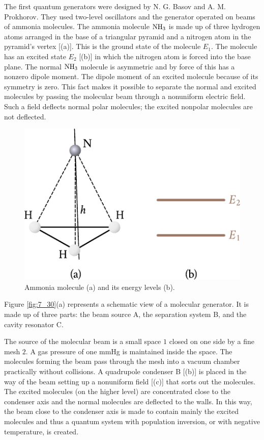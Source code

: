 The first quantum generators were designed by N. G. Basov and A. M. Prokhorov. They used two-level oscillators and the generator operated on beams of ammonia molecules. The ammonia molecule $\ce{NH3}$ is made up of three hydrogen atoms arranged in the base of a triangular pyramid and a nitrogen atom in the pyramid's vertex [(a)]. This is the ground state of the molecule $E_1$. The molecule has an excited state $E_2$ [(b)] in which the nitrogen atom is forced into the base plane. The normal $\ce{NH3}$ molecule is asymmetric and by force of this has a nonzero dipole moment. The dipole moment of an excited molecule because of its symmetry is zero. This fact makes it possible to separate the normal and excited molecules by passing the molecular beam through a nonuniform
electric field. Such a field deflects normal polar molecules; the excited nonpolar molecules are not deflected.

\begin{figure}[t]
	\begin{center}
		\includegraphics[scale=1]{figures/ch_07/fig_7_29.pdf}
		\caption[]{Ammonia molecule (a) and its energy levels (b).}
		\label{fig:7_29}
	\end{center}
	\vspace{-0.8cm}
\end{figure}

Figure \ref{fig:7_30}(a) represents a schematic view of a molecular generator. It is made up of three parts: the beam source A, the separation
system B, and the cavity resonator C.

The source of the molecular beam is a small space $1$ closed on one side by a fine mesh $2$. A gas pressure of one mmHg is maintained inside the space. The molecules forming the beam pass through the mesh into a vacuum chamber practically without collisions. A quadrupole condenser B [(b)] is placed in the way of the beam setting up a nonuniform field [(c)] that sorts out the molecules. The excited molecules (on the higher level) are concentrated close to the condenser axis and the normal molecules are deflected to the walls. In this way, the beam close to the condenser axis is made to contain mainly the excited molecules and thus a quantum system with population inversion, or with negative temperature, is created.

